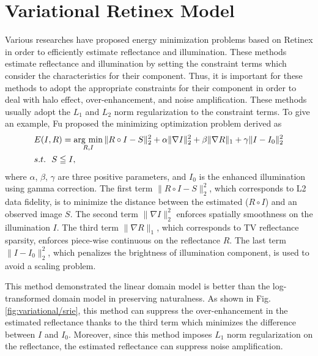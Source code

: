 \section{Variational Retinex Model} \label{sec:variational_retinex}
Various researches have proposed energy minimization problems based on Retinex in order to efficiently estimate reflectance and illumination. These methods estimate reflectance and illumination by setting the constraint terms which consider the characteristics for their component. Thus, it is important for these methods to adopt the appropriate constraints for their component in order to deal with halo effect, over-enhancement, and noise amplification. These methods usually adopt the $L_{1}$ and $L_{2}$ norm regularization to the constraint terms. To give an example, Fu \cite{srie} proposed the minimizing optimization problem derived as
\begin{equation}
\begin{split}
& E(I, R) = \mathop{\rm arg~min}\limits_{R, I} \|R \circ I - S\|_{2}^{2} + \alpha\|\nabla{I}\|_{2}^{2} + \beta\|\nabla{R}\|_{1} + \gamma\|I - I_{0}\|_{2}^{2} \\
& s.t. \ \ S \leqq I, \label{eq:srie_equation}
\end{split}
\end{equation}
where $\alpha$, $\beta$, $\gamma$ are three positive parameters, and $I_{0}$ is the enhanced illumination using gamma correction.
The first term $\|R \circ I - S\|_{2}^{2}$, which corresponds to L2 data fidelity, is to minimize the distance between the estimated ($R\circ{I}$) and an observed image $S$. The second term $\|\nabla{I}\|_{2}^{2} $ enforces spatially smoothness on the illumination $I$. The third term $\|\nabla{R}\|_{1}$, which corresponds to TV reflectance sparsity, enforces piece-wise continuous on the reflectance $R$. The last term $\|I-I_{0}\|_{2}^{2}$, which penalizes the brightness of illumination component, is used to avoid a scaling problem. \par
This method demonstrated the linear domain model is better than the log-transformed domain model in preserving naturalness. As shown in Fig. \ref{fig:variational/srie}, this method can suppress the over-enhancement in the estimated reflectance thanks to the third term which minimizes the difference between $I$ and $I_{0}$. Moreover, since this method imposes $L_{1}$ norm regularization on the reflectance, the estimated reflectance can suppress noise amplification.

